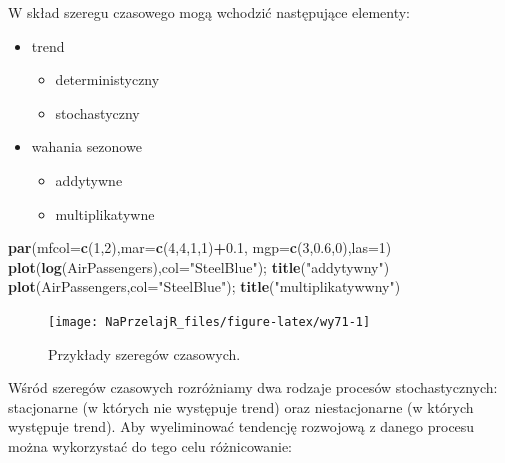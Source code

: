 \documentclass[polish,]{book}
\newenvironment{Shaded}{\begin{snugshade}}{\end{snugshade}}
\newcommand{\DataTypeTok}[1]{\textcolor[rgb]{0.13,0.29,0.53}{#1}}
\newcommand{\DecValTok}[1]{\textcolor[rgb]{0.00,0.00,0.81}{#1}}
\newcommand{\FloatTok}[1]{\textcolor[rgb]{0.00,0.00,0.81}{#1}}
\newcommand{\KeywordTok}[1]{\textcolor[rgb]{0.13,0.29,0.53}{\textbf{#1}}}
\newcommand{\NormalTok}[1]{#1}
\newcommand{\OperatorTok}[1]{\textcolor[rgb]{0.81,0.36,0.00}{\textbf{#1}}}
\newcommand{\StringTok}[1]{\textcolor[rgb]{0.31,0.60,0.02}{#1}}
\begin{document}
W skład szeregu czasowego mogą wchodzić następujące elementy:

\begin{itemize}
\item
  trend

  \begin{itemize}
  \item
    deterministyczny
  \item
    stochastyczny
  \end{itemize}
\item
  wahania sezonowe

  \begin{itemize}
  \item
    addytywne
  \item
    multiplikatywne
  \end{itemize}
\end{itemize}

\begin{Shaded}
\begin{Highlighting}[]
\KeywordTok{par}\NormalTok{(}\DataTypeTok{mfcol=}\KeywordTok{c}\NormalTok{(}\DecValTok{1}\NormalTok{,}\DecValTok{2}\NormalTok{),}\DataTypeTok{mar=}\KeywordTok{c}\NormalTok{(}\DecValTok{4}\NormalTok{,}\DecValTok{4}\NormalTok{,}\DecValTok{1}\NormalTok{,}\DecValTok{1}\NormalTok{)}\OperatorTok{+}\FloatTok{0.1}\NormalTok{, }\DataTypeTok{mgp=}\KeywordTok{c}\NormalTok{(}\DecValTok{3}\NormalTok{,}\FloatTok{0.6}\NormalTok{,}\DecValTok{0}\NormalTok{),}\DataTypeTok{las=}\DecValTok{1}\NormalTok{)}
\KeywordTok{plot}\NormalTok{(}\KeywordTok{log}\NormalTok{(AirPassengers),}\DataTypeTok{col=}\StringTok{"SteelBlue"}\NormalTok{); }\KeywordTok{title}\NormalTok{(}\StringTok{"addytywny"}\NormalTok{)}
\KeywordTok{plot}\NormalTok{(AirPassengers,}\DataTypeTok{col=}\StringTok{"SteelBlue"}\NormalTok{); }\KeywordTok{title}\NormalTok{(}\StringTok{"multiplikatywwny"}\NormalTok{)}
\end{Highlighting}
\end{Shaded}

\begin{figure}[h]

{\centering \texttt{[image: NaPrzelajR\_files/figure-latex/wy71-1]} 

}

\caption{Przykłady szeregów czasowych.}\label{fig:wy71}
\end{figure}

Wśród szeregów czasowych rozróżniamy dwa rodzaje procesów stochastycznych:
stacjonarne (w których nie występuje trend) oraz niestacjonarne (w których występuje trend). Aby wyeliminować tendencję rozwojową z danego procesu można
wykorzystać do tego celu różnicowanie:
\end{document}
